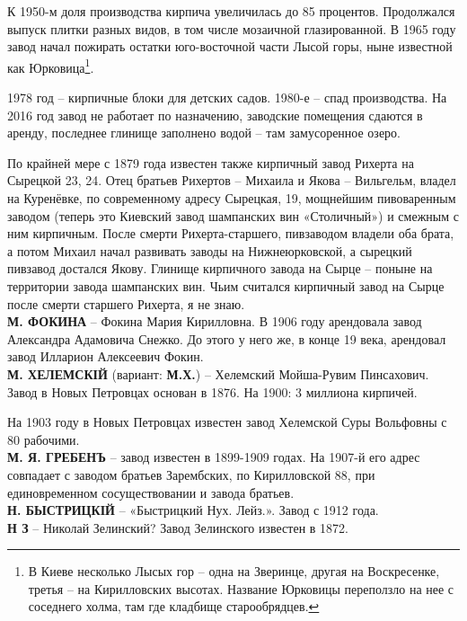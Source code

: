 К 1950-м доля производства кирпича увеличилась до 85 процентов. Продолжался выпуск плитки разных видов, в том числе мозаичной глазированной. В 1965 году завод начал пожирать остатки юго-восточной части Лысой горы, ныне известной как Юрковица\footnote{В Киеве несколько Лысых гор – одна на Зверинце, другая на Воскресенке, третья – на Кирилловских высотах. Название Юрковицы переползло на нее с соседнего холма, там где кладбище старообрядцев.}.

1978 год – кирпичные блоки для детских садов. 1980-е – спад производства. На 2016 год завод не работает по назначению, заводские помещения сдаются в аренду, последнее глинище заполнено водой – там замусоренное озеро.

По крайней мере с 1879 года известен также кирпичный завод Рихерта на Сырецкой 23, 24. Отец братьев Рихертов – Михаила и Якова – Вильгельм, владел на Куренёвке, по современному адресу Сырецкая, 19, мощнейшим пивоваренным заводом (теперь это Киевский завод шампанских вин «Столичный») и смежным с ним кирпичным. После смерти Рихерта-старшего, пивзаводом владели оба брата, а потом Михаил начал развивать заводы на Нижнеюрковской, а сырецкий пивзавод достался Якову. Глинище кирпичного завода на Сырце – поныне на территории завода шампанских вин. Чьим считался кирпичный завод на Сырце после смерти старшего Рихерта, я не знаю.\\

\noindent\textbf{М. ФОКИНА} – Фокина Мария Кирилловна. В 1906 году арендовала завод Александра Адамовича Снежко. До этого у него же, в конце 19 века, арендовал завод Илларион Алексеевич Фокин.\\

\noindent\textbf{М. ХЕЛЕМСКІЙ} (вариант: \textbf{М.Х.}) – Хелемский Мойша-Рувим Пинсахович. Завод в Новых Петровцах основан в 1876. На 1900: 3 миллиона кирпичей.

На 1903 году в Новых Петровцах известен завод Хелемской Суры Вольфовны с 80 рабочими.\\

\noindent\textbf{М. Я. ГРЕБЕНЪ} – завод известен в 1899-1909 годах. На 1907-й его адрес совпадает с заводом братьев Зарембских, по Кирилловской 88, при единовременном сосуществовании и завода братьев.\\

\noindent\textbf{Н. БЫСТРИЦКІЙ} – «Быстрицкий Нух. Лейз.». Завод с 1912 года.\\

\noindent\textbf{Н З} – Николай Зелинский? Завод Зелинского известен в 1872.\\

